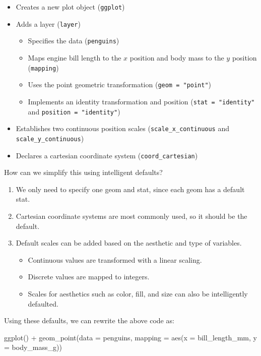\documentclass[
]{article}
\newenvironment{Shaded}{\begin{snugshade}}{\end{snugshade}}
\newcommand{\AttributeTok}[1]{\textcolor[rgb]{0.77,0.63,0.00}{#1}}
\newcommand{\FunctionTok}[1]{\textcolor[rgb]{0.00,0.00,0.00}{#1}}
\newcommand{\NormalTok}[1]{#1}
\newcommand{\SpecialCharTok}[1]{\textcolor[rgb]{0.00,0.00,0.00}{#1}}
\providecommand{\tightlist}{%
  \setlength{\itemsep}{0pt}\setlength{\parskip}{0pt}}
\begin{document}
\begin{itemize}
\item
  Creates a new plot object (\texttt{ggplot})
\item
  Adds a layer (\texttt{layer})

  \begin{itemize}
  \tightlist
  \item
    Specifies the data (\texttt{penguins})
  \item
    Maps engine bill length to the \(x\) position and body mass to the
    \(y\) position (\texttt{mapping})
  \item
    Uses the point geometric transformation (\texttt{geom\ =\ "point"})
  \item
    Implements an identity transformation and position
    (\texttt{stat\ =\ "identity"} and \texttt{position\ =\ "identity"})
  \end{itemize}
\item
  Establishes two continuous position scales
  (\texttt{scale\_x\_continuous} and \texttt{scale\_y\_continuous})
\item
  Declares a cartesian coordinate system (\texttt{coord\_cartesian})
\end{itemize}

How can we simplify this using intelligent defaults?

\begin{enumerate}
\def\labelenumi{\arabic{enumi}.}
\item
  We only need to specify one geom and stat, since each geom has a
  default stat.
\item
  Cartesian coordinate systems are most commonly used, so it should be
  the default.
\item
  Default scales can be added based on the aesthetic and type of
  variables.

  \begin{itemize}
  \tightlist
  \item
    Continuous values are transformed with a linear scaling.
  \item
    Discrete values are mapped to integers.
  \item
    Scales for aesthetics such as color, fill, and size can also be
    intelligently defaulted.
  \end{itemize}
\end{enumerate}

Using these defaults, we can rewrite the above code as:

\begin{Shaded}
\begin{Highlighting}[]
\FunctionTok{ggplot}\NormalTok{() }\SpecialCharTok{+}
  \FunctionTok{geom\_point}\NormalTok{(}\AttributeTok{data =}\NormalTok{ penguins, }\AttributeTok{mapping =} \FunctionTok{aes}\NormalTok{(}\AttributeTok{x =}\NormalTok{ bill\_length\_mm, }\AttributeTok{y =}\NormalTok{ body\_mass\_g))}
\end{Highlighting}
\end{Shaded}
\end{document}
